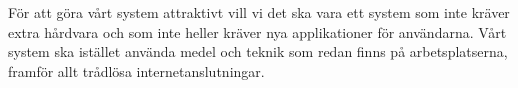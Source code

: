 \documentclass[swedish, a4paper,12pt]{article}
\begin{document}

För att göra vårt system attraktivt vill vi det ska vara ett system som inte kräver extra hårdvara och som inte heller kräver nya applikationer för användarna. Vårt system ska istället använda medel och teknik som redan finns på arbetsplatserna, framför allt trådlösa internetanslutningar.









\end{document}
